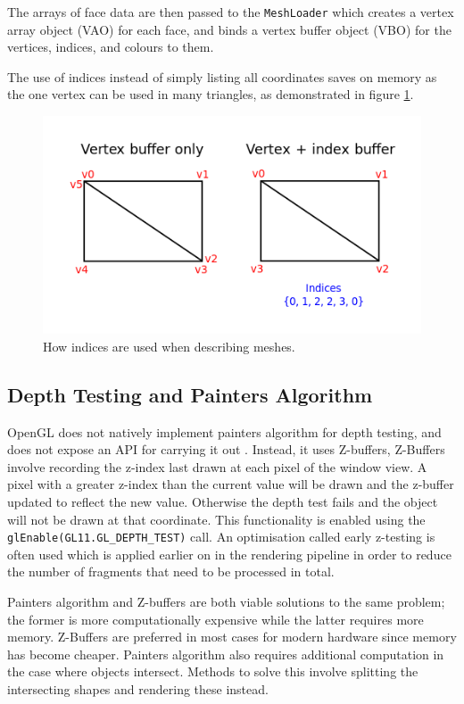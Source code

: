 \documentclass[12pt]{article}
\begin{document}
The arrays of face data are then passed to the \texttt{MeshLoader} which creates a vertex array object (VAO) for each face, and binds a vertex buffer object (VBO) for the vertices, indices, and colours to them.

The use of indices instead of simply listing all coordinates saves on memory as the one vertex can be used in many triangles, as demonstrated in figure \ref{fig:index_mesh}.

\begin{figure}[!ht]
	\centering
	\includegraphics[width=\linewidth]{images/vertex_vs_index}
	\caption{How indices are used when describing meshes.}
	\label{fig:index_mesh}
\end{figure}

\subsection{Depth Testing and Painters Algorithm}

OpenGL does not natively implement painters algorithm for depth testing, and does not expose an API for carrying it out .
Instead, it uses Z-buffers, 
Z-Buffers involve recording the z-index last drawn at each pixel of the window view. 
A pixel with a greater z-index than the current value will be drawn and the z-buffer updated to reflect the new value.
Otherwise the depth test fails and the object will not be drawn at that coordinate.
This functionality is enabled using the \texttt{glEnable(GL11.GL\_DEPTH\_TEST)} call.
An optimisation called early z-testing is often used which is applied earlier on in the rendering pipeline in order to reduce the number of fragments that need to be processed in total.

Painters algorithm and Z-buffers are both viable solutions to the same problem; the former is more computationally expensive while the latter requires more memory.
Z-Buffers are preferred in most cases for modern hardware since memory has become cheaper. 
Painters algorithm also requires additional computation in the case where objects intersect. 
Methods to solve this involve splitting the intersecting shapes and rendering these instead.
\end{document}
